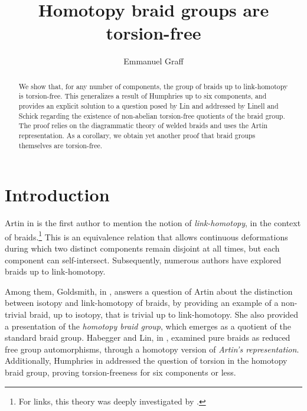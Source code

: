 \documentclass[11pt, a4paper, twoside,reqno]{amsart}
\theoremstyle{plain}
\theoremstyle{definition}
\theoremstyle{remark}
\begin{document}
\normalem
\title{Homotopy braid groups are torsion-free}
\author{Emmanuel Graff}
	

 \begin{abstract}

We show that, for any number of components, the group of braids up to link-homotopy is torsion-free. This generalizes a result of Humphries up to six components, and provides an explicit solution to a question posed by Lin and addressed by Linell and Schick regarding the existence of non-abelian torsion-free quotients of the braid group. The proof relies on the diagrammatic theory of welded braids and uses the Artin representation. As a corollary, we obtain yet another proof that braid groups themselves are torsion-free.
\end{abstract}


\maketitle
\section*{Introduction}
Artin in \cite{ArtinBraid} is the first author to mention the notion of \emph{link-homotopy}, in the context of braids.\footnote{For links, this theory was deeply investigated by \cite{MilnorLinkgrp,Levine4comp,HabeggerLinHomotopy}.} This is an equivalence relation that allows continuous deformations during which two distinct components remain disjoint at all times, but each component can self-intersect. Subsequently, numerous authors have explored braids up to link-homotopy.

Among them, Goldsmith, in \cite{GoldsmithHomotopybraids}, answers a question of Artin about the distinction between isotopy and link-homotopy of braids, by providing an example of a non-trivial braid, up to isotopy, that is trivial up to link-homotopy. She also provided a presentation of the \emph{homotopy braid group}, which emerges as a quotient of the standard braid group. Habegger and Lin, in \cite{HabeggerLinHomotopy}, examined pure braids as reduced free group automorphisms, through a homotopy version of \emph{Artin's representation}. Additionally, Humphries in \cite{HumphriesTorsion} addressed the question of torsion in the homotopy braid group, proving torsion-freeness for six components or less.
\end{document}
